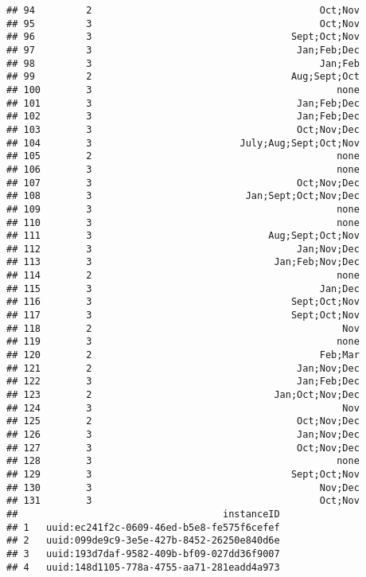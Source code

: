 \documentclass[
]{article}
\begin{document}
\begin{verbatim}
## 94         2                                        Oct;Nov
## 95         3                                        Oct;Nov
## 96         3                                   Sept;Oct;Nov
## 97         3                                    Jan;Feb;Dec
## 98         3                                        Jan;Feb
## 99         2                                   Aug;Sept;Oct
## 100        3                                           none
## 101        3                                    Jan;Feb;Dec
## 102        3                                    Jan;Feb;Dec
## 103        3                                    Oct;Nov;Dec
## 104        3                          July;Aug;Sept;Oct;Nov
## 105        2                                           none
## 106        3                                           none
## 107        3                                    Oct;Nov;Dec
## 108        3                           Jan;Sept;Oct;Nov;Dec
## 109        3                                           none
## 110        3                                           none
## 111        3                               Aug;Sept;Oct;Nov
## 112        3                                    Jan;Nov;Dec
## 113        3                                Jan;Feb;Nov;Dec
## 114        2                                           none
## 115        3                                        Jan;Dec
## 116        3                                   Sept;Oct;Nov
## 117        3                                   Sept;Oct;Nov
## 118        2                                            Nov
## 119        3                                           none
## 120        2                                        Feb;Mar
## 121        2                                    Jan;Nov;Dec
## 122        3                                    Jan;Feb;Dec
## 123        2                                Jan;Oct;Nov;Dec
## 124        3                                            Nov
## 125        2                                    Oct;Nov;Dec
## 126        3                                    Jan;Nov;Dec
## 127        3                                    Oct;Nov;Dec
## 128        3                                           none
## 129        3                                   Sept;Oct;Nov
## 130        3                                        Nov;Dec
## 131        3                                        Oct;Nov
##                                    instanceID
## 1   uuid:ec241f2c-0609-46ed-b5e8-fe575f6cefef
## 2   uuid:099de9c9-3e5e-427b-8452-26250e840d6e
## 3   uuid:193d7daf-9582-409b-bf09-027dd36f9007
## 4   uuid:148d1105-778a-4755-aa71-281eadd4a973

\end{verbatim}
\end{document}
